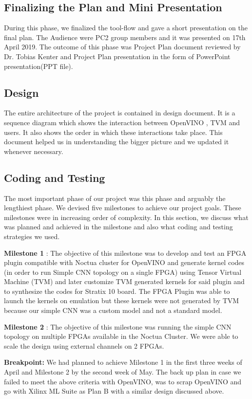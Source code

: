 \subsection{Finalizing the Plan and Mini Presentation}

During this phase, we finalized the tool-flow and gave a short presentation on the final plan. The Audience were PC2 group members and it was presented on 17th April 2019. The outcome of this phase was Project Plan document reviewed by Dr. Tobias Kenter and Project Plan presentation in the form of PowerPoint presentation(PPT file). 

\subsection{Design}
The entire architecture of the project is contained in design document. It is a sequence diagram which shows the interaction between OpenVINO , TVM and users. It also shows the order in which these interactions take place. This document helped us in understanding the bigger picture and we updated it whenever necessary. 

\subsection{Coding and Testing}
The most important phase of our project was this phase and arguably the lengthiest phase. We devised five milestones to achieve our project goals. These milestones were in increasing order of complexity. In this section, we discuss what was planned and achieved in the milestone and also what coding and testing strategies we used. 


\textbf{Milestone 1} : The objective of this milestone was to develop and test an FPGA plugin compatible with Noctua cluster for OpenVINO and generate kernel codes (in order to run Simple CNN
topology on a single FPGA) using Tensor Virtual Machine (TVM) and later customize TVM generated kernels for said plugin and to synthesize the codes for Stratix 10 board. 
The FPGA Plugin was able to launch the kernels on emulation but these kernels were not generated by TVM because our simple CNN was a custom model and not a standard model.  


\textbf{Milestone 2} : The objective of this milestone was running the simple CNN topology on multiple FPGAs available in the Noctua Cluster. We were able to scale the design using external channels on 2 FPGAs. 

\textbf{Breakpoint:} We had planned to achieve Milestone 1 in the first three weeks of April and Milestone 2 by the second week of May. The back up plan in case we failed to meet the above criteria with OpenVINO, was to scrap OpenVINO and go with Xilinx ML Suite as Plan B with a similar design discussed above. 

